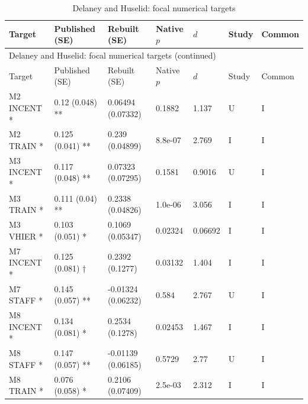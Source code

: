 {\scriptsize\setlength{\tabcolsep}{3pt}\renewcommand{\arraystretch}{1.06}
\begin{longtable}{@{}p{.245\linewidth}p{.17\linewidth}p{.17\linewidth}p{.085\linewidth}p{.060\linewidth}p{.08\linewidth}p{.07\linewidth}@{}}
\caption{Delaney and Huselid: focal numerical targets}\label{tab:focal:delaney1996}\\
\toprule Target & Published (SE) & Rebuilt (SE) & Native $p$ & $d$ & Study & Common\\\midrule
\endfirsthead\multicolumn{7}{l}{\small Delaney and Huselid: focal numerical targets (continued)}\\\toprule Target & Published (SE) & Rebuilt (SE) & Native $p$ & $d$ & Study & Common\\\midrule\endhead\bottomrule\endfoot
M2 INCENT * & 0.12 (0.048) ** & 0.06494 (0.07332) & 0.1882 & 1.137 & U & I\\
M2 TRAIN * & 0.125 (0.041) ** & 0.239 (0.04899) & 8.8e-07 & 2.769 & I & I\\
M3 INCENT * & 0.117 (0.048) ** & 0.07323 (0.07295) & 0.1581 & 0.9016 & U & I\\
M3 TRAIN * & 0.111 (0.04) ** & 0.2338 (0.04826) & 1.0e-06 & 3.056 & I & I\\
M3 VHIER * & 0.103 (0.051) * & 0.1069 (0.05347) & 0.02324 & 0.06692 & I & I\\
M7 INCENT * & 0.125 (0.081) † & 0.2392 (0.1277) & 0.03132 & 1.404 & I & I\\
M7 STAFF * & 0.145 (0.057) ** & -0.01324 (0.06232) & 0.584 & 2.767 & U & I\\
M8 INCENT * & 0.134 (0.081) * & 0.2534 (0.1278) & 0.02453 & 1.467 & I & I\\
M8 STAFF * & 0.147 (0.057) ** & -0.01139 (0.06185) & 0.5729 & 2.77 & U & I\\
M8 TRAIN * & 0.076 (0.058) * & 0.2106 (0.07409) & 2.5e-03 & 2.312 & I & I\\
\end{longtable}}

